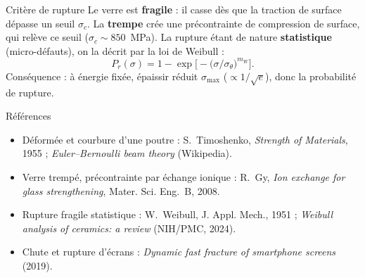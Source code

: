 \documentclass[11pt,aspectratio=169]{beamer}
\begin{document}
\begin{frame}{Critère de rupture}
  \footnotesize
  Le verre est \textbf{fragile} : il casse dès que la traction de surface dépasse
  un seuil $\sigma_c$. La \textbf{trempe} crée une précontrainte de compression de
  surface, qui relève ce seuil ($\sigma_c\sim 850$~MPa). La rupture étant de
  nature \textbf{statistique} (micro-défauts), on la décrit par la loi de Weibull :
  \[ P_r(\sigma)=1-\exp\!\Big[-\big(\sigma/\sigma_\theta\big)^{m_W}\Big]. \]
  \centering\textcolor{danger}{Conséquence : à énergie fixée, épaissir réduit
  $\sigma_{\max}$ ($\propto 1/\sqrt{e}$), donc la probabilité de rupture.}
\end{frame}

\begin{frame}{Références}
  \scriptsize
  \begin{itemize}\itemsep2pt
    \item Déformée et courbure d'une poutre : S.~Timoshenko, \emph{Strength of
          Materials}, 1955 ; \emph{Euler--Bernoulli beam theory} (Wikipedia).
    \item Verre trempé, précontrainte par échange ionique : R.~Gy,
          \emph{Ion exchange for glass strengthening}, Mater. Sci. Eng.~B, 2008.
    \item Rupture fragile statistique : W.~Weibull, J. Appl. Mech., 1951 ;
          \emph{Weibull analysis of ceramics: a review} (NIH/PMC, 2024).
    \item Chute et rupture d'écrans : \emph{Dynamic fast fracture of smartphone
          screens} (2019).
  \end{itemize}
\end{frame}
\end{document}
